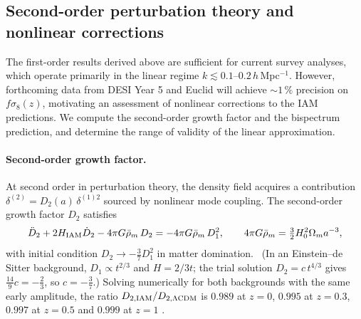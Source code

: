 \subsection{Second-order perturbation theory and nonlinear corrections}
The first-order results derived above are sufficient for current survey analyses, which operate primarily in the linear regime
$k\lesssim0.1$--$0.2\,h$\,Mpc$^{-1}$. However, forthcoming data from DESI Year 5 and Euclid will achieve $\sim1\,\%$ precision on $f\sigma_8(z)$, motivating an
assessment of nonlinear corrections to the IAM predictions. We compute the second-order growth factor and the bispectrum prediction, and determine the
range of validity of the linear approximation.

\paragraph{Second-order growth factor.} At second order in perturbation theory, the density field acquires a contribution
$\delta^{(2)}=D_2(a)\,\delta^{(1)2}$ sourced by nonlinear mode coupling. The second-order growth factor $D_2$ satisfies~\cite{Bernardeau2002}
\begin{equation}\ddot D_2+2H_{\rm IAM}\dot D_2-4\pi G\bar\rho_m\,D_2=-4\pi G\bar\rho_m\,D_1^2,\qquad4\pi G\bar\rho_m=\tfrac32H_0^2\Omega_ma^{-3},\label{eq:th:D2}\end{equation}
with initial condition $D_2\to-\tfrac37D_1^2$ in matter domination. \derived\ (In an Einstein--de Sitter background, $D_1\propto t^{2/3}$ and $H=2/3t$;
the trial solution $D_2=c\,t^{4/3}$ gives $\tfrac{14}{9}c=-\tfrac23$, so $c=-\tfrac37$.) Solving numerically for both backgrounds with the same early
amplitude, the ratio $D_{2,\rm IAM}/D_{2,\Lambda\rm CDM}$ is $0.989$ at $z=0$, $0.995$ at $z=0.3$, $0.997$ at $z=0.5$ and $0.999$ at $z=1$ \calc.

